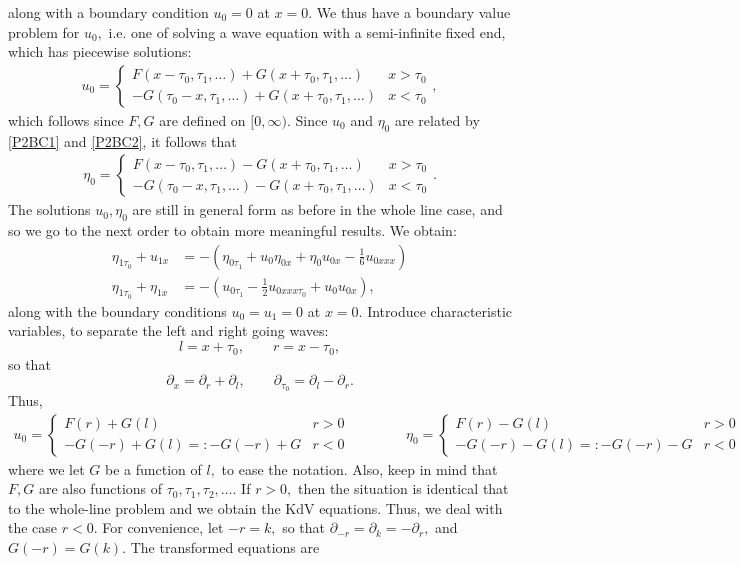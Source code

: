 \documentclass[10pt,reqno,oneside,a4paper]{article}
\begin{document}
along with a boundary condition $u_0 = 0$ at $x=0.$ We thus have a boundary value problem for $u_0,$ i.e. one of solving a wave equation with a semi-infinite fixed end, which has piecewise solutions:
\begin{align*}
u_0 = \begin{cases} F(x - \tau_0, \tau_1, \ldots) + G(x+\tau_0, \tau_1, \ldots) & x>\tau_0 \\ -G(\tau_0 - x,  \tau_1, \ldots) + G(x+\tau_0,  \tau_1, \ldots) & x< \tau_0 \end{cases},
\end{align*}
which follows since $F,G$ are defined on $[0, \infty).$ Since $u_0$ and $\eta_0$ are related by \eqref{P2BC1} and \eqref{P2BC2}, it follows that
\begin{align*}
\eta_0 = \begin{cases} F(x - \tau_0,  \tau_1, \ldots) - G(x+\tau_0,  \tau_1, \ldots) & x>\tau_0 \\ -G(\tau_0 - x,  \tau_1, \ldots) - G(x+\tau_0,  \tau_1, \ldots) & x< \tau_0 \end{cases}.
\end{align*}
The solutions $u_0, \eta_0$ are still in general form as before in the whole line case, and so we go to the next order to obtain more meaningful results. We obtain:
\begin{align*}
\eta_{1\tau_0} + u_{1x} &= - (\eta_{0\tau_1} + u_0 \eta_{0x} + \eta_0 u_{0x} - \frac{1}{6}u_{0xxx}) \\
\eta_{1\tau_0} + \eta_{1x} &= - (u_{0\tau_1} - \frac{1}{2}u_{0xxx\tau_0} + u_0 u_{0x}),
\end{align*}
along with the boundary conditions $u_0 = u_1 = 0$ at $x = 0.$ Introduce characteristic variables, to separate the left and right going waves:
\[ 
l = x + \tau_0, \qquad r = x - \tau_0, 
\]
so that 
\[ 
\partial_x = \partial_r + \partial_l, \qquad \partial_{\tau_0} = \partial_l - \partial_r.
\]
Thus, 
\begin{align*}
u_0 = \begin{cases} F(r) + G(l) & r>0 \\ -G(-r) + G(l) =: -G(-r)+G & r<0 \end{cases} \qquad\qquad \eta_0 = \begin{cases} F(r)-G(l) & r>0 \\ -G(-r) - G(l)=: -G(-r) - G & r<0 \end{cases} 
\end{align*}
where we let $G$ be a function of $l,$ to ease the notation. Also, keep in mind that $F,G$ are also functions of $\tau_0, \tau_1, \tau_2, \ldots.$ If $r > 0,$ then the situation is identical that to the whole-line problem and we obtain the KdV equations. Thus, we deal with the case $r<0.$ For convenience, let $-r = k,$ so that $\partial_{-r} = \partial_k = - \partial_r,$ and $G(-r)= G(k).$ The transformed equations are
\end{document}

